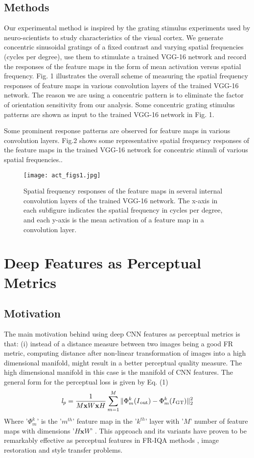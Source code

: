 \documentclass[10pt,twocolumn,letterpaper]{article}
\begin{document}
\subsection{Methods}
Our experimental method is inspired by the grating stimulus experiments used by neuro-scientists to study characteristics of the visual cortex. We generate concentric sinusoidal gratings of a fixed contrast and varying spatial frequencies (cycles per degree), use them to stimulate a trained VGG-16 \cite{30} network and record the responses of the feature maps in the form of mean activation versus spatial frequency. Fig. 1 illustrates the overall scheme of measuring the spatial frequency responses of feature maps in various convolution layers of the trained VGG-16 network. The reason we are using a concentric pattern is to eliminate the factor of orientation sensitivity from our analysis. Some concentric grating stimulus patterns are shown as input to the trained VGG-16 network in Fig. 1. 

    Some prominent response patterns are observed for feature maps in various convolution layers. Fig.2 shows some representative spatial frequency responses of the feature maps in the trained VGG-16 network for concentric stimuli of various spatial frequencies..
    
\begin{figure}[t!]
\texttt{[image: act\_figs1.jpg]}
\caption{Spatial frequency responses of the feature maps in several internal convolution layers of the trained VGG-16 network. The x-axis in each subfigure indicates the spatial frequency in cycles per degree, and each y-axis is the mean activation of a feature map in a convolution layer.}
\label{fig:Spike_Sorting}
\end{figure}

\section{Deep Features as Perceptual Metrics}
\subsection{Motivation}
The main motivation behind using deep CNN features as perceptual metrics is that: (i) instead of a distance measure between two images being a good FR metric, computing distance after non-linear transformation of images into a high dimensional manifold, might result in a better perceptual quality measure. The high dimensional manifold in this case is the manifold of CNN features. The general form for the perceptual loss \cite{7} is given by Eq. (1)
\begin{equation}
\mathit{l_p}=\frac{1}{M\mathbf{x} W\mathbf{x} H}\sum\limits_{m=1}^M\Vert\Phi^k_m(I\textsubscript{out})-\Phi^k_m(I\textsubscript{GT})\Vert_2^2
\end{equation}
Where '$\Phi^k_m$' is the '$\textit{m}^{th}$' feature map in the '$\textit{k}^{th}$' layer with '$\textit{M}$' number of feature maps with dimensions '$\textit{H$\mathbf{x}$W}$' . This approach and its variants have proven to be remarkably effective as perceptual features in FR-IQA methods \cite{25}, image restoration \cite{10} and style transfer \cite{11} problems. 
\end{document}
